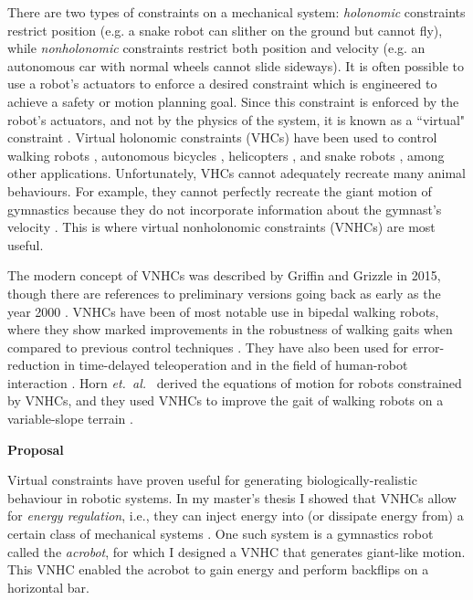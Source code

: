 \documentclass[a4paper,12pt]{article}
\begin{document}
There are two types of constraints on a mechanical system:
\textit{holonomic} constraints restrict position (e.g. a snake robot can slither
on the ground but cannot fly),
while \textit{nonholonomic} constraints restrict both position and
velocity (e.g. an autonomous car with normal wheels cannot slide sideways).
It is often possible to use a robot's actuators to enforce a desired constraint
which is engineered to achieve a safety or motion planning goal.
Since this constraint is enforced by the robot's actuators, and not by the
physics of the system, it is known as a ``virtual" constraint
\cite{vhcs_for_el_systems}.
Virtual holonomic constraints (VHCs) have been used to control walking robots
\cite{stable_walking}, autonomous bicycles \cite{bicycle},
helicopters \cite{helicopter}, and snake robots \cite{snake_robot},
among other applications.
Unfortunately, VHCs cannot adequately recreate many animal behaviours.
For example, they cannot perfectly recreate the giant motion of gymnastics 
because they do not incorporate information about the gymnast's velocity
\cite{xingbo_thesis}.
This is where virtual nonholonomic constraints (VNHCs) are most useful.

The modern concept of VNHCs was described by
Griffin and Grizzle \cite{nhvc_dynamic_walking} in 2015, though there are
references to preliminary versions going back as early as the year 2000
\cite{vnhc_human_robot_coop}.
VNHCs have been of most notable use in bipedal walking robots,
where they show marked improvements in the robustness of walking gaits
when compared to previous control techniques
\cite{nhvc_gait_optimization,output_nhvc_bipedal_control}.
They have also been used for error-reduction in time-delayed teleoperation
\cite{vnhc_time_delay_teleop} and in the field of human-robot interaction
\cite{psd_based_vnhc_redundant_manipulator,haptic_vnhc}.
Horn \textit{et.~al.}~\cite{hybrid_zero_dynamics_bipedal_nhvcs} derived the 
equations of motion for robots constrained by VNHCs, and they used VNHCs to
improve the gait of walking robots on a variable-slope terrain
\cite{nhvc_incline_walking}.

\begin{large} \textbf{Proposal} \end{large}

Virtual constraints have proven useful for generating biologically-realistic
behaviour in robotic systems.
In my master's thesis I showed that VNHCs allow for \textit{energy regulation},
i.e., they can inject energy into (or dissipate energy from) a certain class of
mechanical systems \cite{my-thesis}.
One such system is a gymnastics robot called the
\textit{acrobot}, for which I designed a VNHC that generates giant-like motion. 
This VNHC enabled the acrobot to gain energy and perform backflips on a
horizontal bar.
\end{document}
